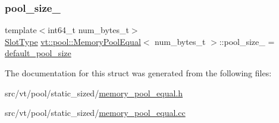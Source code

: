\mbox{\label{structvt_1_1pool_1_1_memory_pool_equal_a8f5d69e4d35c30c9f9913ccc80350f0a}} 
\subsubsection{\texorpdfstring{pool\+\_\+size\+\_\+}{pool\_size\_}}
{\footnotesize\ttfamily template$<$int64\+\_\+t num\+\_\+bytes\+\_\+t$>$ \\
\hyperlink{structvt_1_1pool_1_1_memory_pool_equal_a101fdcb943d0cb0863cf17655e0b4e1c}{Slot\+Type} \hyperlink{structvt_1_1pool_1_1_memory_pool_equal}{vt\+::pool\+::\+Memory\+Pool\+Equal}$<$ num\+\_\+bytes\+\_\+t $>$\+::pool\+\_\+size\+\_\+ = \hyperlink{structvt_1_1pool_1_1_memory_pool_equal_a67dae02a7795b182a7302b9eb34924e7}{default\+\_\+pool\+\_\+size}\hspace{0.3cm}{\ttfamily [private]}}



The documentation for this struct was generated from the following files\+:\begin{DoxyCompactItemize}
\item 
src/vt/pool/static\+\_\+sized/\hyperlink{memory__pool__equal_8h}{memory\+\_\+pool\+\_\+equal.\+h}\item 
src/vt/pool/static\+\_\+sized/\hyperlink{memory__pool__equal_8cc}{memory\+\_\+pool\+\_\+equal.\+cc}\end{DoxyCompactItemize}
